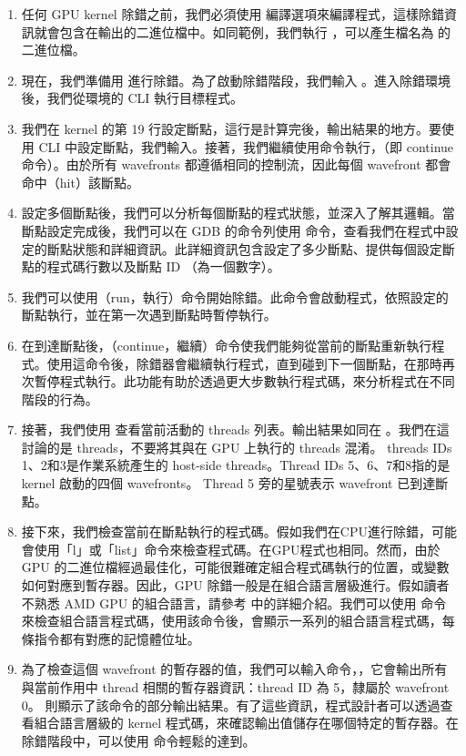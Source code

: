 \begin{enumerate}
    \item 任何 GPU kernel 除錯之前，我們必須使用  編譯選項來編譯程式，這樣除錯資訊就會包含在輸出的二進位檔中。如同範例，我們執行 ，可以產生檔名為  的二進位檔。
    \item 現在，我們準備用 進行除錯。為了啟動除錯階段，我們輸入 。進入除錯環境後，我們從環境的 CLI 執行目標程式。
    \item 我們在 kernel 的第 19 行設定斷點，這行是計算完後，輸出結果的地方。要使用 CLI 中設定斷點，我們輸入。接著，我們繼續使用命令執行，（即 continue 命令）。由於所有 wavefronts 都遵循相同的控制流，因此每個 wavefront 都會命中（hit）該斷點。
    \item 設定多個斷點後，我們可以分析每個斷點的程式狀態，並深入了解其邏輯。當斷點設定完成後，我們可以在 GDB 的命令列使用  命令，查看我們在程式中設定的斷點狀態和詳細資訊。此詳細資訊包含設定了多少斷點、提供每個設定斷點的程式碼行數以及斷點 ID （為一個數字）。
    \item 我們可以使用（run，執行）命令開始除錯。此命令會啟動程式，依照設定的斷點執行，並在第一次遇到斷點時暫停執行。
    \item 在到達斷點後，（continue，繼續）命令使我們能夠從當前的斷點重新執行程式。使用這命令後，除錯器會繼續執行程式，直到碰到下一個斷點，在那時再次暫停程式執行。此功能有助於透過更大步數執行程式碼，來分析程式在不同階段的行為。
    \item 接著，我們使用  查看當前活動的 threads 列表。輸出結果如同在 。我們在這討論的是  threads，不要將其與在 GPU 上執行的 threads 混淆。 threads IDs 1、2和3是作業系統產生的 host-side threads。Thread IDs 5、6、7和8指的是 kernel 啟動的四個 wavefronts。 Thread 5 旁的星號表示 wavefront 已到達斷點。
    \item 接下來，我們檢查當前在斷點執行的程式碼。假如我們在CPU進行除錯，可能會使用「l」或「list」命令來檢查程式碼。在GPU程式也相同。然而，由於 GPU 的二進位檔經過最佳化，可能很難確定組合程式碼執行的位置，或變數如何對應到暫存器。因此，GPU 除錯一般是在組合語言層級進行。假如讀者不熟悉 AMD GPU 的組合語言，請參考  中的詳細介紹。我們可以使用  命令來檢查組合語言程式碼，使用該命令後，會顯示一系列的組合語言程式碼，每條指令都有對應的記憶體位址。
    \item 為了檢查這個 wavefront 的暫存器的值，我們可以輸入命令，，它會輸出所有與當前作用中 thread 相關的暫存器資訊：thread ID 為 5，隸屬於 wavefront 0。 則顯示了該命令的部分輸出結果。有了這些資訊，程式設計者可以透過查看組合語言層級的 kernel 程式碼，來確認輸出值儲存在哪個特定的暫存器。在  除錯階段中，可以使用  命令輕鬆的達到。


\end{enumerate}
